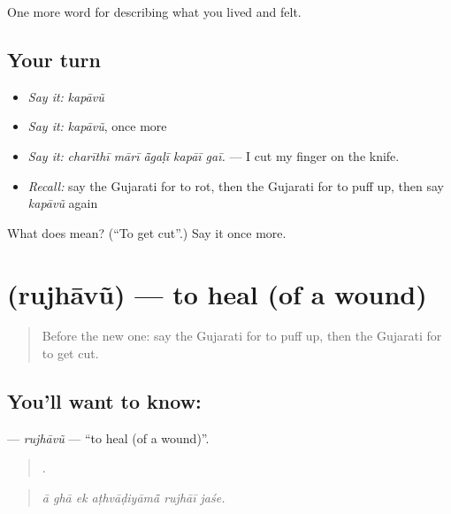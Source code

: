 \begin{grammarlens}[title={What you've built}]
One more word for describing what you lived and felt.
\end{grammarlens}

\subsection*{Your turn}
\begin{itemize}
\raggedright
  \item \emph{Say it:} \emph{kapāvũ}
  \item \emph{Say it:} \emph{kapāvũ}, once more
  \item \emph{Say it:} \emph{charīthī mārī ā̃gaḷī kapāī gaī.} — I cut my finger on the knife.
  \item \emph{Recall:} say the Gujarati for to rot, then the Gujarati for to puff up, then say \emph{kapāvũ} again
\end{itemize}

\begin{tcolorbox}[breakable,colback=teal!4,colframe=teal!35!black,title={Before you move on}]
What does  mean? (\textquotedblleft{}To get cut\textquotedblright{}.) Say it once more.
\end{tcolorbox}
\section[\texorpdfstring{\gu{રુઝાવું} (rujhāvũ)}{રુઝાવું (rujhāvũ)}]{ (rujhāvũ) — to heal (of a wound)}

\label{lesson:GU-C481-rujhavu}



\begin{quote}
Before the new one: say the Gujarati for to puff up, then the Gujarati for to get cut.
\end{quote}

\subsection*{You'll want to know: }
\textbf{} — \emph{rujhāvũ} — \textquotedblleft{}to heal (of a wound)\textquotedblright{}.

\begin{quote}
     .
\end{quote}

\begin{quote}
\emph{ā ghā ek aṭhvāḍiyāmā̃ rujhāī jaśe.}
\end{quote}

